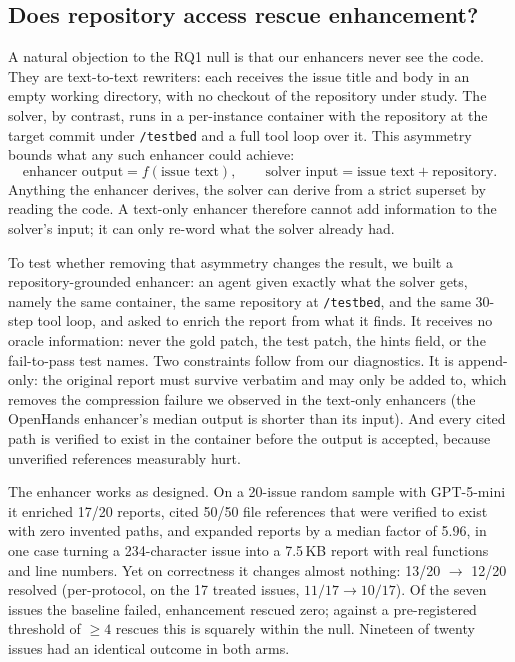 \documentclass[journal]{IEEEtran}
\begin{document}
\subsection{Does repository access rescue enhancement?}
\label{sec:repogrounded}
A natural objection to the RQ1 null is that our enhancers never see the code. They are text-to-text rewriters: each receives the issue title and body in an empty working directory, with no checkout of the repository under study. The solver, by contrast, runs in a per-instance container with the repository at the target commit under \texttt{/testbed} and a full tool loop over it. This asymmetry bounds what any such enhancer could achieve:
\[
\text{enhancer output} = f(\text{issue text}), \qquad
\text{solver input} = \text{issue text} + \text{repository}.
\]
Anything the enhancer derives, the solver can derive from a strict superset by reading the code. A text-only enhancer therefore cannot add information to the solver's input; it can only re-word what the solver already had.

To test whether removing that asymmetry changes the result, we built a repository-grounded enhancer: an agent given exactly what the solver gets, namely the same container, the same repository at \texttt{/testbed}, and the same 30-step tool loop, and asked to enrich the report from what it finds. It receives no oracle information: never the gold patch, the test patch, the hints field, or the fail-to-pass test names. Two constraints follow from our diagnostics. It is append-only: the original report must survive verbatim and may only be added to, which removes the compression failure we observed in the text-only enhancers (the OpenHands enhancer's median output is shorter than its input). And every cited path is verified to exist in the container before the output is accepted, because unverified references measurably hurt.

The enhancer works as designed. On a 20-issue random sample with GPT-5-mini it enriched 17/20 reports, cited 50/50 file references that were verified to exist with zero invented paths, and expanded reports by a median factor of 5.96, in one case turning a 234-character issue into a 7.5\,KB report with real functions and line numbers. Yet on correctness it changes almost nothing: 13/20 $\rightarrow$ 12/20 resolved (per-protocol, on the 17 treated issues, $11/17 \rightarrow 10/17$). Of the seven issues the baseline failed, enhancement rescued zero; against a pre-registered threshold of $\geq 4$ rescues this is squarely within the null. Nineteen of twenty issues had an identical outcome in both arms.
\end{document}
